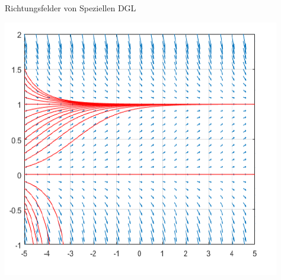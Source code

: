 \begin{definition}{Richtungsfelder von Speziellen DGL}
\begin{minipage}{0.4\linewidth}
\begin{center}
      \includegraphics[width=1\linewidth]{images/AutonomeDGL.png}
      \end{center}
  \end{minipage}
\end{definition}






